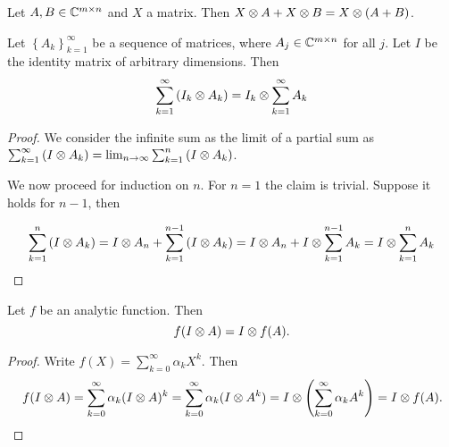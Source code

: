 \begin{lemma}
    Let $A,B \in \mathbb{C}^{m \times n}$ and $X$ a matrix. Then $X \otimes A + X \otimes B = X \otimes (A + B)$.
\end{lemma}

\begin{proposition}
    Let $\left\{A_k\right\}_{k = 1}^\infty$ be a sequence of matrices, where $A_j \in \mathbb{C}^{m \times n}$ for all $j$. Let $I$ be the identity matrix of arbitrary dimensions. Then 
    \[ \sum_{k = 1}^\infty \left(I_k \otimes A_k\right) = I_k \otimes \sum_{k = 1}^\infty A_k \]
\end{proposition}

\begin{proof}
    We consider the infinite sum as the limit of a partial sum as $\sum_{k = 1}^\infty \left(I \otimes A_k\right) = \lim_{n \to \infty} \sum_{k = 1}^n \left(I \otimes A_k\right)$.

    We now proceed for induction on $n$. For $n = 1$ the claim is trivial. Suppose it holds for $n-1$, then 

    \[
        \sum_{k = 1}^n \left(I \otimes A_k\right) = I \otimes A_n + \sum_{k = 1}^{n-1} \left(I \otimes A_k\right) = I \otimes A_n + I \otimes \sum_{k = 1}^{n-1} A_k = I \otimes \sum_{k = 1}^n A_k
    \]
\end{proof}

\begin{theorem}
    Let $f$ be an analytic function. Then
    \[
        f(I \otimes A) = I \otimes f(A).
    \]
    \label{th:analytic}
\end{theorem}

\begin{proof}
    Write $f(X) = \sum_{k=0}^\infty \alpha_k X^k$. Then
    \[
        f(I \otimes A) = \sum_{k=0}^\infty \alpha_k (I \otimes A)^k
        = \sum_{k=0}^\infty \alpha_k (I \otimes A^k)
        = I \otimes \left(\sum_{k=0}^\infty \alpha_k A^k\right)
        = I \otimes f(A).
    \]
\end{proof}


